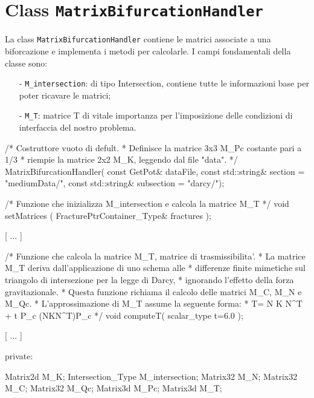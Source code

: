 \section{Class \texttt{MatrixBifurcationHandler}}
La class \texttt{MatrixBifurcationHandler} contiene le matrici associate a una biforcazione e implementa i metodi per calcolarle. 
I campi fondamentali della classe sono:
	\begin{enumerate}
	\item[-] \texttt{M\_intersection}: di tipo Intersection, contiene tutte le informazioni base per poter ricavare le matrici;
	\item[-] \texttt{M\_T}: matrice T di vitale importanza per l'imposizione delle condizioni di interfaccia del nostro problema.
	\end{enumerate} 
\begin{Code03_03}[caption={Classe \texttt{Intersection}}]
	/* Costruttore vuoto di defult. 
	 * Definisce la matrice 3x3 M_Pc costante pari a 1/3 
	 * riempie la matrice 2x2 M_K, leggendo dal file "data".
	 */ 
	MatrixBifurcationHandler( const GetPot& dataFile,
				const std::string& section = "mediumData/",
				const std::string& subsection = "darcy/");
	
	
	/* Funzione che inizializza M_intersection e calcola la matrice M_T 
	 */
	void setMatrices ( FracturePtrContainer_Type& fractures );
	
	[ ... ]
	
	/* Funzione che calcola la matrice M_T, matrice di trasmissibilita'. 
	 * La matrice M_T deriva dall'applicazione di uno schema alle 
	 * differenze finite mimetiche sul triangolo di intersezione per la legge di Darcy, 
	 * ignorando l'effetto della forza gravitazionale.
	 * Questa funzione richiama il calcolo delle matrici M_C, M_N e M_Qc.
	 * L'approssimazione di M_T assume la seguente forma:
	 * 					 T= N K N^T + t P_c (NKN^T)P_c
	 */	
	void computeT( scalar_type t=6.0 );

	[ ... ]

private:

	Matrix2d M_K;
	Intersection_Type M_intersection;
	Matrix32 M_N;
	Matrix32 M_C;
	Matrix32 M_Qc;
	Matrix3d M_Pc;
	Matrix3d M_T;
	
\end{Code03_03}

